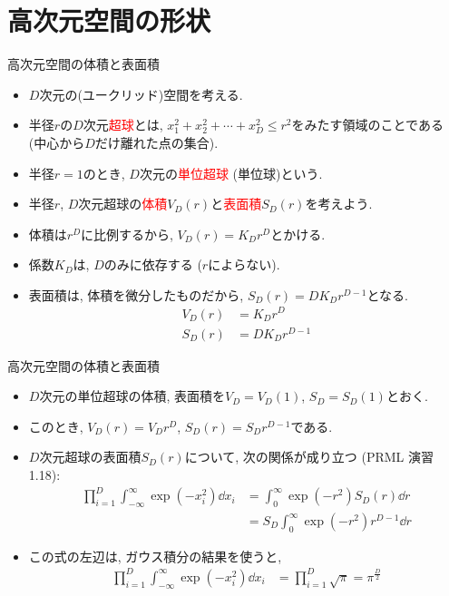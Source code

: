\documentclass[dvipdfmx,notheorems,t]{beamer}
\begin{document}
\section{高次元空間の形状}

\begin{frame}{高次元空間の体積と表面積}
\begin{itemize}
  \item $D$次元の(ユークリッド)空間を考える.
  \item 半径$r$の$D$次元\textcolor{red}{超球}とは, $x_1^2 + x_2^2 + \cdots + x_D^2 \le r^2$をみたす領域のことである
  (中心から$D$だけ離れた点の集合).
  \item 半径$r = 1$のとき, $D$次元の\textcolor{red}{単位超球} (単位球)という. \newline
  \item 半径$r$, $D$次元超球の\textcolor{red}{体積}$V_D(r)$と\textcolor{red}{表面積}$S_D(r)$を考えよう.
  \item 体積は$r^D$に比例するから, $V_D(r) = K_D r^D$とかける.
  \item 係数$K_D$は, $D$のみに依存する ($r$によらない).
  \item 表面積は, 体積を微分したものだから, $S_D(r) = D K_D r^{D - 1}$となる.
  \begin{align*}
    V_D(r) &= K_D r^D \\
    S_D(r) &= D K_D r^{D - 1}
  \end{align*}
\end{itemize}
\end{frame}

\begin{frame}{高次元空間の体積と表面積}
\begin{itemize}
  \item $D$次元の単位超球の体積, 表面積を$V_D = V_D(1)$, $S_D = S_D(1)$とおく.
  \item このとき, $V_D(r) = V_D r^D$, $S_D(r) = S_D r^{D - 1}$である.
  \item $D$次元超球の表面積$S_D(r)$について, 次の関係が成り立つ (PRML 演習1.18):
  \begin{align*}
    \prod_{i = 1}^D \int_{-\infty}^\infty \exp(-x_i^2) \dd{x_i}
      &= \int_0^\infty \exp(-r^2) S_D(r) \dd{r} \\
      &= S_D \int_0^\infty \exp(-r^2) r^{D - 1} \dd{r}
  \end{align*}

  \item この式の左辺は, ガウス積分の結果を使うと,
  \begin{align*}
    \prod_{i = 1}^D \int_{-\infty}^\infty \exp(-x_i^2) \dd{x_i}
    &= \prod_{i = 1}^D \sqrt{\pi} = \pi^\frac{D}{2}
  \end{align*}
\end{itemize}
\end{frame}
\end{document}
